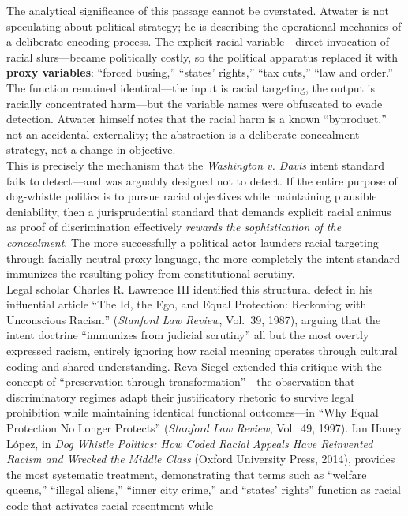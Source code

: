 \documentclass[
]{article}
\begin{document}
\noindent The analytical significance of this passage cannot be
overstated. Atwater is not speculating about political strategy; he is
describing the operational mechanics of a deliberate encoding process.
The explicit racial variable---direct invocation of racial
slurs---became politically costly, so the political apparatus replaced it
with \textbf{proxy variables}: ``forced busing,'' ``states' rights,''
``tax cuts,'' ``law and order.'' The function remained identical---the
input is racial targeting, the output is racially concentrated harm---but
the variable names were obfuscated to evade detection. Atwater himself
notes that the racial harm is a known ``byproduct,'' not an accidental
externality; the abstraction is a deliberate concealment strategy, not a
change in objective.\\
This is precisely the mechanism that the \emph{Washington v. Davis}
intent standard fails to detect---and was arguably designed not to
detect. If the entire purpose of dog-whistle politics is to pursue
racial objectives while maintaining plausible deniability, then a
jurisprudential standard that demands explicit racial animus as proof of
discrimination effectively \emph{rewards the sophistication of the
concealment}. The more successfully a political actor launders racial
targeting through facially neutral proxy language, the more completely
the intent standard immunizes the resulting policy from constitutional
scrutiny.\\
Legal scholar Charles R. Lawrence III identified this structural defect
in his influential article ``The Id, the Ego, and Equal Protection:
Reckoning with Unconscious Racism'' (\emph{Stanford Law Review}, Vol.\
39, 1987), arguing that the intent doctrine ``immunizes from judicial
scrutiny'' all but the most overtly expressed racism, entirely ignoring
how racial meaning operates through cultural coding and shared
understanding. Reva Siegel extended this critique with the concept of
``preservation through transformation''---the observation that
discriminatory regimes adapt their justificatory rhetoric to survive
legal prohibition while maintaining identical functional
outcomes---in ``Why Equal Protection No Longer Protects'' (\emph{Stanford
Law Review}, Vol.\ 49, 1997). Ian Haney L\'{o}pez, in \emph{Dog Whistle
Politics: How Coded Racial Appeals Have Reinvented Racism and Wrecked
the Middle Class} (Oxford University Press, 2014), provides the most
systematic treatment, demonstrating that terms such as ``welfare
queens,'' ``illegal aliens,'' ``inner city crime,'' and ``states'
rights'' function as racial code that activates racial resentment while
\end{document}
